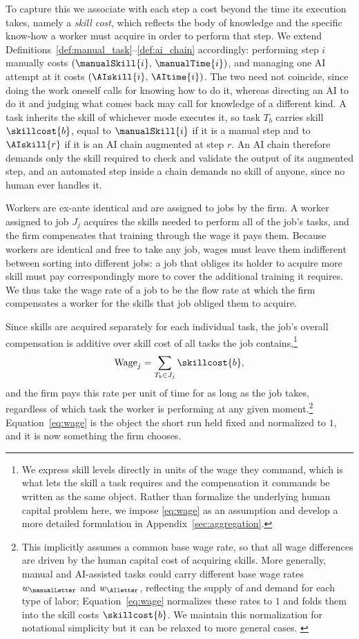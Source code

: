 To capture this we associate with each step a cost beyond the time its execution takes, namely a \emph{skill cost}, which reflects the body of knowledge and the specific know-how a worker must acquire in order to perform that step.
We extend Definitions~\ref{def:manual_task}--\ref{def:ai_chain} accordingly: performing step $i$ manually costs $(\manualSkill{i},\, \manualTime{i})$, and managing one AI attempt at it costs $(\AIskill{i},\, \AItime{i})$.
The two need not coincide, since doing the work oneself calls for knowing how to do it, whereas directing an AI to do it and judging what comes back may call for knowledge of a different kind.
A task inherits the skill of whichever mode executes it, so task $T_b$ carries skill $\skillcost{b}$, equal to $\manualSkill{i}$ if it is a manual step and to $\AIskill{r}$ if it is an AI chain augmented at step $r$.
An AI chain therefore demands only the skill required to check and validate the output of its augmented step, and an automated step inside a chain demands no skill of anyone, since no human ever handles it.

Workers are ex-ante identical and are assigned to jobs by the firm.
A worker assigned to job $J_j$ acquires the skills needed to perform all of the job's tasks, and the firm compensates that training through the wage it pays them.
Because workers are identical and free to take any job, wages must leave them indifferent between sorting into different jobs: a job that obliges its holder to acquire more skill must pay correspondingly more to cover the additional training it requires.
We thus take the wage rate of a job to be the flow rate at which the firm compensates a worker for the skills that job obliged them to acquire.

Since skills are acquired separately for each individual task, the job's overall compensation is additive over skill cost of all tasks the job contains,\footnote{
We express skill levels directly in units of the wage they command, which is what lets the skill a task requires and the compensation it commands be written as the same object.
Rather than formalize the underlying human capital problem here, we impose \eqref{eq:wage} as an assumption and develop a more detailed formulation in Appendix~\ref{sec:aggregation}.
}
\begin{align}
\label{eq:wage}
\text{Wage}_j = \sum_{T_b \in J_j} \skillcost{b},
\end{align}
and the firm pays this rate per unit of time for as long as the job takes, regardless of which task the worker is performing at any given moment.\footnote{
This implicitly assumes a common base wage rate, so that all wage differences are driven by the human capital cost of acquiring skills.
More generally, manual and AI-assisted tasks could carry different base wage rates $w_{\manualLetter}$ and $w_{\AIletter}$, reflecting the supply of and demand for each type of labor; Equation~\eqref{eq:wage} normalizes these rates to $1$ and folds them into the skill costs $\skillcost{b}$.
We maintain this normalization for notational simplicity but it can be relaxed to more general cases.
\label{foot:wage}
}
Equation~\eqref{eq:wage} is the object the short run held fixed and normalized to $1$, and it is now something the firm chooses.

